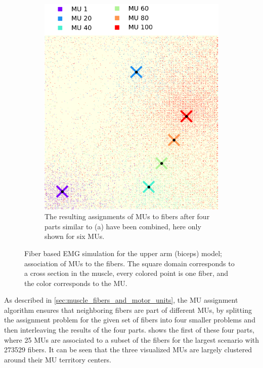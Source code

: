 \begin{figure}
\begin{subfigure}[t]{0.47\textwidth}
    \includegraphics[width=\textwidth]{images/results/application/MU_fibre_distribution_523x523_100mus_txt_2d_fiber_distribution_.png}%
    \caption{The resulting assignments of MUs to fibers after four parts similar to (a) have been combined, here only shown for six MUs.}%
    \label{fig:mu_assignment_total}%
  \end{subfigure} 
  \caption{Fiber based EMG simulation for the upper arm (biceps) model; association of MUs to the fibers. The square domain corresponds to a cross section in the muscle, every colored point is one fiber, and the color corresponds to the MU. }%
  \label{fig:mu_assignment_100}%
\end{figure}%

As described in \cref{sec:muscle_fibers_and_motor_units}, the MU assignment algorithm ensures that neighboring fibers are part of different MUs, by splitting the assignment problem for the given set of fibers into four smaller problems and then interleaving the results of the four parts.  shows the first of these four parts, where 25 MUs are associated to a subset of the fibers for the largest scenario with \num{273529} fibers. It can be seen that the three visualized MUs are largely clustered around their MU territory centers.

